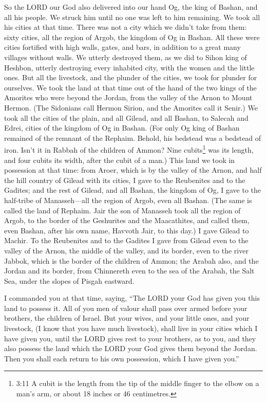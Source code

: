  So the LORD our God also delivered into our hand Og, the
king of Bashan, and all his people. We struck him until no one was left
to him remaining.  We took all his cities at that time.
There was not a city which we didn't take from them: sixty cities, all
the region of Argob, the kingdom of Og in Bashan.  All these
were cities fortified with high walls, gates, and bars, in addition to a
great many villages without walls.  We utterly destroyed
them, as we did to Sihon king of Heshbon, utterly destroying every
inhabited city, with the women and the little ones.  But all
the livestock, and the plunder of the cities, we took for plunder for
ourselves.  We took the land at that time out of the hand of
the two kings of the Amorites who were beyond the Jordan, from the
valley of the Arnon to Mount Hermon.  (The Sidonians call
Hermon Sirion, and the Amorites call it Senir.)  We took
all the cities of the plain, and all Gilead, and all Bashan, to Salecah
and Edrei, cities of the kingdom of Og in Bashan.  (For
only Og king of Bashan remained of the remnant of the Rephaim. Behold,
his bedstead was a bedstead of iron. Isn't it in Rabbah of the children
of Ammon? Nine cubits\footnote{3:11 A cubit is the length from the tip
  of the middle finger to the elbow on a man's arm, or about 18 inches
  or 46 centimetres.} was its length, and four cubits its width, after
the cubit of a man.)  This land we took in possession at
that time: from Aroer, which is by the valley of the Arnon, and half the
hill country of Gilead with its cities, I gave to the Reubenites and to
the Gadites;  and the rest of Gilead, and all Bashan, the
kingdom of Og, I gave to the half-tribe of Manasseh---all the region of
Argob, even all Bashan. (The same is called the land of Rephaim.
 Jair the son of Manasseh took all the region of Argob, to
the border of the Geshurites and the Maacathites, and called them, even
Bashan, after his own name, Havvoth Jair, to this day.)  I
gave Gilead to Machir.  To the Reubenites and to the
Gadites I gave from Gilead even to the valley of the Arnon, the middle
of the valley, and its border, even to the river Jabbok, which is the
border of the children of Ammon;  the Arabah also, and the
Jordan and its border, from Chinnereth even to the sea of the Arabah,
the Salt Sea, under the slopes of Pisgah eastward.

 I commanded you at that time, saying, ``The LORD your God
has given you this land to possess it. All of you men of valour shall
pass over armed before your brothers, the children of Israel.
 But your wives, and your little ones, and your livestock,
(I know that you have much livestock), shall live in your cities which I
have given you,  until the LORD gives rest to your
brothers, as to you, and they also possess the land which the LORD your
God gives them beyond the Jordan. Then you shall each return to his own
possession, which I have given you.''

